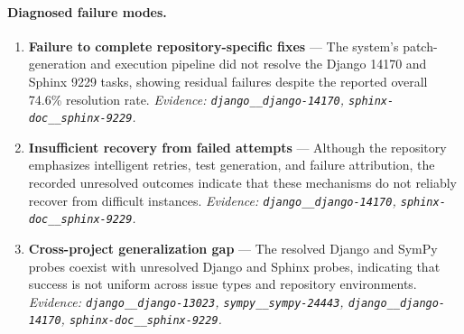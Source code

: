 \paragraph{Diagnosed failure modes.}\begin{enumerate}\itemsep1pt
\item \textbf{Failure to complete repository-specific fixes} --- The system's patch-generation and execution pipeline did not resolve the Django 14170 and Sphinx 9229 tasks, showing residual failures despite the reported overall 74.6\% resolution rate. \emph{Evidence: \texttt{django\_\_django-14170}, \texttt{sphinx-doc\_\_sphinx-9229}.}
\item \textbf{Insufficient recovery from failed attempts} --- Although the repository emphasizes intelligent retries, test generation, and failure attribution, the recorded unresolved outcomes indicate that these mechanisms do not reliably recover from difficult instances. \emph{Evidence: \texttt{django\_\_django-14170}, \texttt{sphinx-doc\_\_sphinx-9229}.}
\item \textbf{Cross-project generalization gap} --- The resolved Django and SymPy probes coexist with unresolved Django and Sphinx probes, indicating that success is not uniform across issue types and repository environments. \emph{Evidence: \texttt{django\_\_django-13023}, \texttt{sympy\_\_sympy-24443}, \texttt{django\_\_django-14170}, \texttt{sphinx-doc\_\_sphinx-9229}.}
\end{enumerate}
